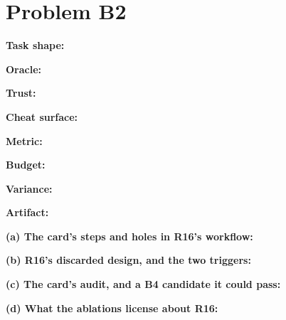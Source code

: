 \documentclass[11pt]{article}
\begin{document}
\section*{Problem B2}\label{ans:B2}
\begin{answer}
\textbf{Task shape:} \vspace{1cm}

\textbf{Oracle:} \vspace{1cm}

\textbf{Trust:} \vspace{1cm}

\textbf{Cheat surface:} \vspace{1cm}

\textbf{Metric:} \vspace{1cm}

\textbf{Budget:} \vspace{1cm}

\textbf{Variance:} \vspace{1cm}

\textbf{Artifact:} \vspace{1cm}

\textbf{(a) The card's steps and holes in R16's workflow:} \vspace{2cm}

\textbf{(b) R16's discarded design, and the two triggers:} \vspace{2cm}

\textbf{(c) The card's audit, and a B4 candidate it could pass:} \vspace{2cm}

\textbf{(d) What the ablations license about R16:} \vspace{1.5cm}
\end{answer}
\end{document}
